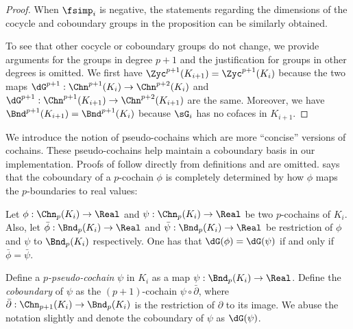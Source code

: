 \begin{proof}
When $\fsimp_i$ is negative,
the statements regarding the dimensions of the 
cocycle and coboundary groups 
in the proposition
can be similarly obtained.

To see that other cocycle or coboundary groups do not change, 
we provide arguments for the groups in degree $p+1$ 
and the justification for groups in other degrees is omitted.
We first have $\Zyc^{p+1}(K_{i+1})=\Zyc^{p+1}(K_{i})$
because the two 
maps $\dG^{p+1}: \Chn^{p+1}(K_i)\to \Chn^{p+2}(K_i)$ and
$\dG^{p+1}: \Chn^{p+1}(K_{i+1})\to \Chn^{p+2}(K_{i+1})$ are the same.
Moreover, 
we have $\Bnd^{p+1}(K_{i+1})=\Bnd^{p+1}(K_{i})$
because $\sG_i$ has no cofaces in $K_{i+1}$.
\end{proof}


\newcommand{\ldim}{{p}}
We introduce the notion of {pseudo-cochains}
which are more ``concise'' versions
of  cochains.
These
pseudo-cochains help maintain a coboundary basis
in our implementation.
Proofs of 
follow directly from
definitions
and are omitted.
says that 
the coboundary of a $\ldim$-cochain $\phi$
is completely determined by how $\phi$ maps the $\ldim$-boundaries 
to  real values:
\begin{proposition}\label{prop:cobound-by-bound}
Let
$\phi:\Chn_\ldim(K_i)\to\Real$ 
and $\psi:\Chn_\ldim(K_i)\to\Real$ be two $\ldim$-cochains  of $K_i$.
Also,
let $\bar{\phi}:\Bnd_\ldim(K_i)\to\Real$ and $\bar{\psi}:\Bnd_\ldim(K_i)\to\Real$ be restriction of $\phi$ 
and $\psi$
to $\Bnd_\ldim(K_i)$ respectively.
One has that  $\dG(\phi)=\dG(\psi)$
if and only if $\bar{\phi}=\bar{\psi}$.
\end{proposition}


\begin{definition}
Define a \emph{$\ldim$-pseudo-cochain} $\psi$ in $K_i$ as 
a map $\psi:\Bnd_\ldim(K_i)\to\Real$.
Define the \emph{coboundary} of $\psi$
as the $(\ldim+1)$-cochain $\psi\circ\bar{\partial}$,
where $\bar{\partial}:\Chn_{\ldim+1}(K_i)\to\Bnd_\ldim(K_i)$
is the restriction of $\partial$ to its image.
We abuse the notation slightly and denote 
the coboundary of $\psi$ as $\dG(\psi)$.
\end{definition}

